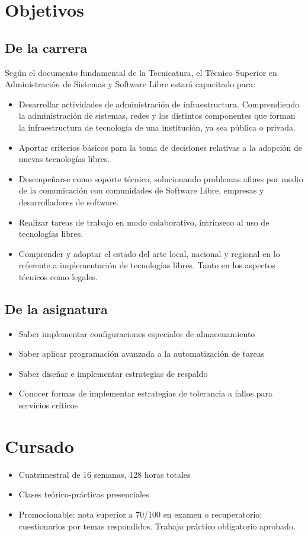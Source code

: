 
\section{Objetivos}
\subsection{De la carrera}
Según el documento fundamental de la Tecnicatura, el Técnico Superior en Administración de Sistemas y Software Libre estará capacitado para:
\begin{itemize}
	\item Desarrollar actividades de administración de infraestructura. Comprendiendo la administración de sistemas, redes y los distintos componentes que forman la
infraestructura de tecnología de una institución, ya sea pública o privada.
	\item Aportar criterios básicos para la toma de decisiones relativas a la adopción de nuevas tecnologías libres.
	\item Desempeñarse como soporte técnico, solucionando problemas afines por medio de la comunicación con comunidades de Software Libre, empresas y desarrolladores de
software.
	\item Realizar tareas de trabajo en modo colaborativo, intrínseco al uso de tecnologías libres.
	\item Comprender y adoptar el estado del arte local, nacional y regional en lo referente a implementación de tecnologías libres. Tanto en los aspectos técnicos como legales.
\end{itemize}
\subsection{De la asignatura}

\begin{itemize}
	\item Saber implementar configuraciones especiales de almacenamiento
	\item Saber aplicar programación avanzada a la automatización de tareas
	\item Saber diseñar e implementar estrategias de respaldo 
	\item Conocer formas de implementar estrategias de tolerancia a fallos para servicios críticos
\end{itemize}


\section{Cursado}
\begin{itemize}
	\item Cuatrimestral de 16 semanas, 128 horas totales
	\item Clases teórico-prácticas presenciales
	\item Promocionable: nota superior a 70/100 en examen o recuperatorio; cuestionarios por 
        temas respondidos. Trabajo práctico obligatorio aprobado.   
\end{itemize}


